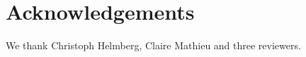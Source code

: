 \documentclass[11pt]{article}
\begin{document}

\section*{Acknowledgements}
 We thank Christoph Helmberg, Claire Mathieu and three reviewers.




\end{document}
